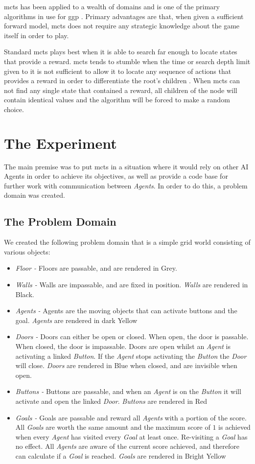 \documentclass{IEEEtran}
\begin{document}
\gls{mcts} \cite{browne2012survey} has been applied to a wealth of domains and is one of the primary algorithms in use for \gls{ggp} \cite{finnsson2008simulation}. Primary advantages are that, when given a sufficient forward model, \gls{mcts} does not require any strategic knowledge about the game itself in order to play.

Standard \gls{mcts} plays best when it is able to search far enough to locate states that provide a reward. \gls{mcts} tends to stumble when the time or search depth limit given to it is not sufficient to allow it to locate any sequence of actions that provides a reward in order to differentiate the root's children \cite{perez2012monte}. When \gls{mcts} can not find any single state that contained a reward, all children of the node will contain identical values and the algorithm will be forced to make a random choice.

\section{The Experiment}
The main premise was to put \gls{mcts} in a situation where it would rely on other AI Agents in order to achieve its objectives, as well as provide a code base for further work with communication between \emph{Agents}. In order to do this, a problem domain was created.
\subsection{The Problem Domain}
We created the following problem domain that is a simple grid world consisting of various objects:
\begin{itemize}
\item{\emph{Floor - } Floors are passable, and are rendered in Grey.}
\item{\emph{Walls -} Walls are impassable, and are fixed in position. \emph{Walls} are rendered in Black.}
\item{\emph{Agents -} Agents are the moving objects that can activate buttons and the goal. \emph{Agents} are rendered in dark Yellow}
\item{\emph{Doors -} Doors can either be open or closed. When open, the door is passable. When closed, the door is impassable. Doors are open whilst an \emph{Agent} is activating a linked \emph{Button}. If the \emph{Agent} stops activating the \emph{Button} the \emph{Door} will close. \emph{Doors} are rendered in Blue when closed, and are invisible when open.}
\item{\emph{Buttons -} Buttons are passable, and when an \emph{Agent} is on the \emph{Button} it will activate and open the linked \emph{Door}. \emph{Buttons} are rendered in Red}
\item{\emph{Goals -} Goals are passable and reward all \emph{Agents} with a portion of the score. All \emph{Goals} are worth the same amount and the maximum score of $1$ is achieved when every \emph{Agent} has visited every \emph{Goal} at least once. Re-visiting a \emph{Goal} has no effect. All \emph{Agents} are aware of the current score achieved, and therefore can calculate if a \emph{Goal} is reached. \emph{Goals} are rendered in Bright Yellow}
\end{itemize}
\end{document}
